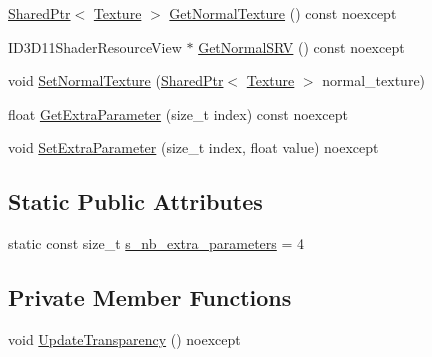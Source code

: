 \begin{DoxyCompactItemize}
\hyperlink{namespacemage_a1e01ae66713838a7a67d30e44c67703e}{Shared\+Ptr}$<$ \hyperlink{classmage_1_1_texture}{Texture} $>$ \hyperlink{structmage_1_1_material_a7343766b10456e4ed1e09b3fe6110981}{Get\+Normal\+Texture} () const noexcept
\item 
I\+D3\+D11\+Shader\+Resource\+View $\ast$ \hyperlink{structmage_1_1_material_a0be98911c56dedaa4fd2f8714fc8a793}{Get\+Normal\+S\+RV} () const noexcept
\item 
void \hyperlink{structmage_1_1_material_a61b695303632bd8fd1399c63e746319e}{Set\+Normal\+Texture} (\hyperlink{namespacemage_a1e01ae66713838a7a67d30e44c67703e}{Shared\+Ptr}$<$ \hyperlink{classmage_1_1_texture}{Texture} $>$ normal\+\_\+texture)
\item 
float \hyperlink{structmage_1_1_material_a1efbefd3f56a7ea01a2a3bfef261f3c0}{Get\+Extra\+Parameter} (size\+\_\+t index) const noexcept
\item 
void \hyperlink{structmage_1_1_material_abc2d6d144f32ca33b2f121b8f5637341}{Set\+Extra\+Parameter} (size\+\_\+t index, float value) noexcept
\end{DoxyCompactItemize}
\subsection*{Static Public Attributes}
\begin{DoxyCompactItemize}
\item 
static const size\+\_\+t \hyperlink{structmage_1_1_material_ab8d10c2cb8ab77bee18654e63acaa63a}{s\+\_\+nb\+\_\+extra\+\_\+parameters} = 4
\end{DoxyCompactItemize}
\subsection*{Private Member Functions}
\begin{DoxyCompactItemize}
\item 
void \hyperlink{structmage_1_1_material_a32525508f9083fd0336e92146083d822}{Update\+Transparency} () noexcept
\end{DoxyCompactItemize}
